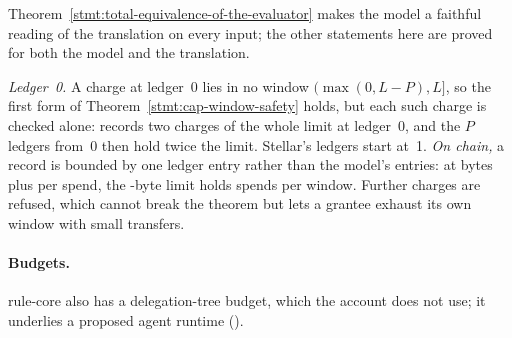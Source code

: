 Theorem~\ref{stmt:total-equivalence-of-the-evaluator} makes the model a faithful
reading of the translation on every input; the other statements here are proved
for both the model and the translation.






\noindent\emph{Ledger~0.} A charge at ledger~0 lies in no window
$(\max(0, L-P), L]$, so the first form of Theorem~\ref{stmt:cap-window-safety}
holds, but each such charge is checked alone: 
records two charges of the whole limit at ledger~0, and the $P$ ledgers from~0
then hold twice the limit. Stellar's ledgers start at~1.
\emph{On chain,} a record is bounded by one ledger entry rather than the model's
 entries: at  bytes
plus  per spend, the
-byte limit holds  spends
per window. Further charges are refused, which cannot break the theorem but lets
a grantee exhaust its own window with small transfers.

\paragraph{Budgets.} rule-core also has a delegation-tree budget, which the
account does not use; it underlies a proposed agent runtime
().


